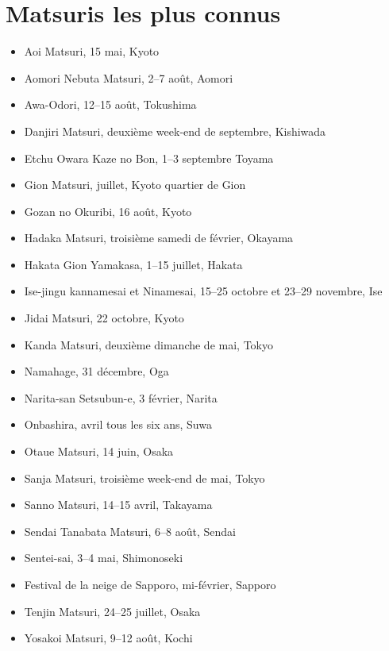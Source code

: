 \section{Matsuris les plus connus}

\begin{itemize}
	\item Aoi Matsuri, 15 mai, Kyoto
	\item Aomori Nebuta Matsuri, 2--7 août, Aomori
	\item Awa-Odori, 12--15 août, Tokushima
	\item Danjiri Matsuri, deuxième week-end de septembre, Kishiwada
	\item Etchu Owara Kaze no Bon, 1--3 septembre Toyama
	\item Gion Matsuri, juillet, Kyoto quartier de Gion
	\item Gozan no Okuribi, 16 août, Kyoto
	\item Hadaka Matsuri, troisième samedi de février, Okayama
	\item Hakata Gion Yamakasa, 1--15 juillet, Hakata
	\item Ise-jingu kannamesai et Ninamesai, 15--25 octobre et 23--29 novembre, Ise
	\item Jidai Matsuri, 22 octobre, Kyoto
	\item Kanda Matsuri, deuxième dimanche de mai, Tokyo
	\item Namahage, 31 décembre, Oga
	\item Narita-san Setsubun-e, 3 février, Narita
	\item Onbashira, avril tous les six ans, Suwa
	\item Otaue Matsuri, 14 juin, Osaka
	\item Sanja Matsuri, troisième week-end de mai, Tokyo
	\item Sanno Matsuri, 14--15 avril, Takayama
	\item Sendai Tanabata Matsuri, 6--8 août, Sendai
	\item Sentei-sai, 3--4 mai, Shimonoseki
	\item Festival de la neige de Sapporo, mi-février, Sapporo
	\item Tenjin Matsuri, 24--25 juillet, Osaka
	\item Yosakoi Matsuri, 9--12 août, Kochi
\end{itemize}


